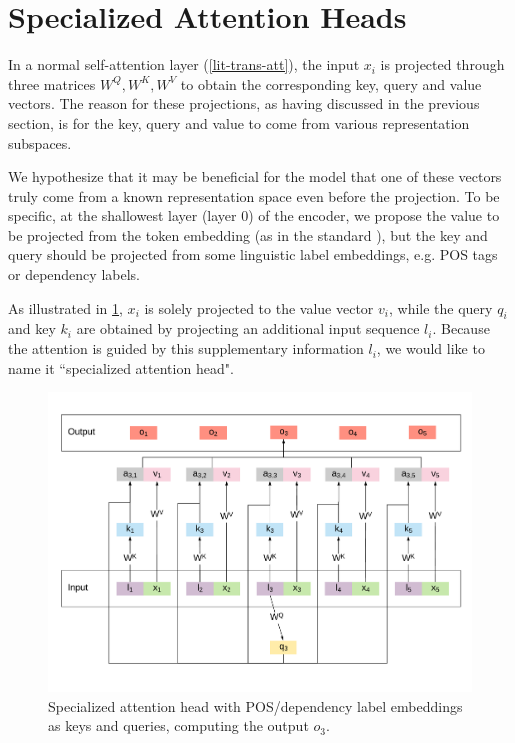 \section{Specialized Attention Heads}
\label{enriching-specialized}

In a normal self-attention layer (\cref{lit-trans-att}), the input $x_i$ is projected through three matrices $W^Q, W^K, W^V$ to obtain the corresponding key, query and value vectors.
The reason for these projections, as having discussed in the previous section, is for the key, query and value to come from various representation subspaces.

We hypothesize that it may be beneficial for the model that one of these vectors truly come from a known representation space even before the projection.
To be specific, at the shallowest layer (layer 0) of the encoder, we propose the value to be projected from the token embedding (as in the standard \transformer), but the key and query should be projected from some linguistic label embeddings, e.g. POS tags or dependency labels.

As illustrated in \cref{fig:specialized-heads}, $x_i$ is solely projected to the value vector $v_i$, while the query $q_i$ and key $k_i$ are obtained by projecting an additional input sequence $l_i$.
Because the attention is guided by this supplementary information $l_i$, we would like to name it ``specialized attention head".

\begin{figure}[t]
    \centering
    \includegraphics[width=\linewidth]{img/specialized-head.pdf}
    \caption{Specialized attention head with POS/dependency label embeddings as keys and queries, computing the output $o_3$.}
    \label{fig:specialized-heads}
\end{figure}

